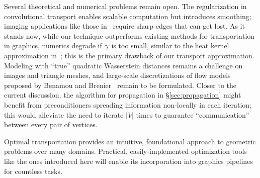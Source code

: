 Several theoretical and numerical problems remain open.  The regularization in convolutional transport enables scalable computation but introduces smoothing; imaging applications like those in~\cite{zhu-2014} require sharp edges that can get lost.  As it stands now, while our technique outperforms existing methods for transportation in graphics, numerics degrade if $\gamma$ is too small, similar to the heat kernel approximation in~\cite{crane-2013}; this is the primary drawback of our transport approximation.  Modeling with ``true'' quadratic Wasserstein distances remains a challenge on images and triangle meshes, and large-scale discretizations of flow models proposed by Benamou and Brenier~ remain to be formulated.  Closer to the current discussion, the algorithm for propagation in \S\ref{sec:propagation} might benefit from preconditioners spreading information non-locally in each iteration; this would alleviate the need to iterate $|V|$ times to guarantee ``communication'' between every pair of vertices.

Optimal transportation provides an intuitive, foundational approach to geometric problems over many domains.  Practical, easily-implemented optimization tools like the ones introduced here will enable its incorporation into graphics pipelines for countless tasks.

